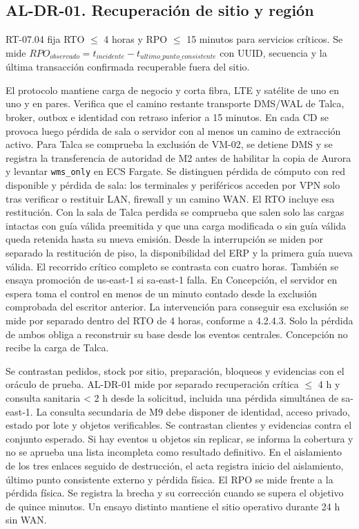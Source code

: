 \subsection*{AL-DR-01. Recuperación de sitio y región}
RT-07.04 fija RTO $\leq$ 4 horas y RPO $\leq$ 15 minutos para servicios críticos. Se mide $RPO_{observado}=t_{incidente}-t_{ultimo\_punto\_consistente}$ con UUID, secuencia y la última transacción confirmada recuperable fuera del sitio.

El protocolo mantiene carga de negocio y corta fibra, LTE y satélite de uno en uno y en pares. Verifica que el camino restante transporte DMS/WAL de Talca, broker, outbox e identidad con retraso inferior a 15 minutos. En cada CD se provoca luego pérdida de sala o servidor con al menos un camino de extracción activo. Para Talca se comprueba la exclusión de VM-02, se detiene DMS y se registra la transferencia de autoridad de M2 antes de habilitar la copia de Aurora y levantar \texttt{wms\_only} en ECS Fargate. Se distinguen pérdida de cómputo con red disponible y pérdida de sala: los terminales y periféricos acceden por VPN solo tras verificar o restituir LAN, firewall y un camino WAN. El RTO incluye esa restitución. Con la sala de Talca perdida se comprueba que salen solo las cargas intactas con guía válida preemitida y que una carga modificada o sin guía válida queda retenida hasta su nueva emisión. Desde la interrupción se miden por separado la restitución de piso, la disponibilidad del ERP y la primera guía nueva válida. El recorrido crítico completo se contrasta con cuatro horas. También se ensaya promoción de us-east-1 si sa-east-1 falla. En Concepción, el servidor en espera toma el control en menos de un minuto contado desde la exclusión comprobada del escritor anterior. La intervención para conseguir esa exclusión se mide por separado dentro del RTO de 4 horas, conforme a 4.2.4.3. Solo la pérdida de ambos obliga a reconstruir su base desde los eventos centrales. Concepción no recibe la carga de Talca.

Se contrastan pedidos, stock por sitio, preparación, bloqueos y evidencias con el oráculo de prueba. AL-DR-01 mide por separado recuperación crítica $\leq$ 4 h y consulta sanitaria < 2 h desde la solicitud, incluida una pérdida simultánea de sa-east-1. La consulta secundaria de M9 debe disponer de identidad, acceso privado, estado por lote y objetos verificables. Se contrastan clientes y evidencias contra el conjunto esperado. Si hay eventos u objetos sin replicar, se informa la cobertura y no se aprueba una lista incompleta como resultado definitivo. En el aislamiento de los tres enlaces seguido de destrucción, el acta registra inicio del aislamiento, último punto consistente externo y pérdida física. El RPO se mide frente a la pérdida física. Se registra la brecha y su corrección cuando se supera el objetivo de quince minutos. Un ensayo distinto mantiene el sitio operativo durante 24 h sin WAN.

